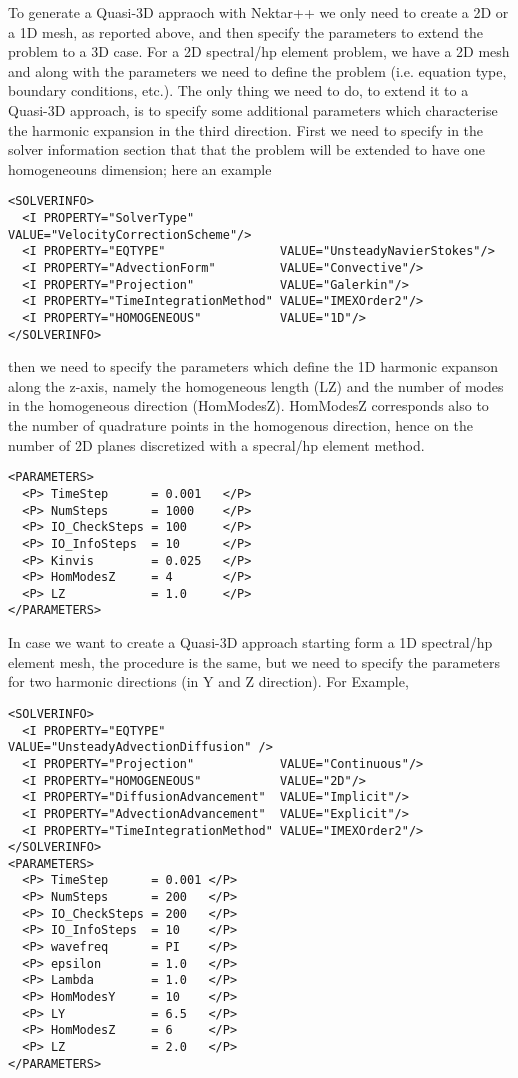 To generate a Quasi-3D appraoch with Nektar++ we only need to create a 2D or a
1D mesh, as reported above, and then specify the parameters to extend the
problem to a 3D case. For a 2D spectral/hp element problem, we have a 2D mesh
and along with the parameters we need to define the problem (i.e. equation type,
boundary conditions, etc.). The only thing we need to do, to extend it to a
Quasi-3D approach, is to specify some additional parameters which characterise
the harmonic expansion in the third direction. First we need to specify in the
solver information section that that the problem will be extended to have one
homogeneouns dimension; here an example

\begin{lstlisting}[style=XMLStyle]
<SOLVERINFO>
  <I PROPERTY="SolverType"            VALUE="VelocityCorrectionScheme"/>
  <I PROPERTY="EQTYPE"                VALUE="UnsteadyNavierStokes"/>
  <I PROPERTY="AdvectionForm"         VALUE="Convective"/>
  <I PROPERTY="Projection"            VALUE="Galerkin"/>
  <I PROPERTY="TimeIntegrationMethod" VALUE="IMEXOrder2"/>
  <I PROPERTY="HOMOGENEOUS"           VALUE="1D"/>
</SOLVERINFO>
\end{lstlisting}

then we need to specify the parameters which define the 1D harmonic expanson
along the z-axis, namely the homogeneous length (LZ) and the number of modes in
the homogeneous direction (HomModesZ). HomModesZ corresponds also to the number
of quadrature points in the homogenous direction, hence on the number of 2D
planes discretized with a specral/hp element method.

\begin{lstlisting}[style=XMLStyle]
<PARAMETERS>
  <P> TimeStep      = 0.001   </P>
  <P> NumSteps      = 1000    </P>
  <P> IO_CheckSteps = 100     </P>
  <P> IO_InfoSteps  = 10      </P>
  <P> Kinvis        = 0.025   </P>
  <P> HomModesZ     = 4       </P>
  <P> LZ            = 1.0     </P>
</PARAMETERS>
\end{lstlisting}

In case we want to create a Quasi-3D approach starting form a 1D spectral/hp
element mesh, the procedure is the same, but we need to specify the parameters
for two harmonic directions (in Y and Z direction). For Example,

\begin{lstlisting}[style=XMLStyle]
<SOLVERINFO>
  <I PROPERTY="EQTYPE"                VALUE="UnsteadyAdvectionDiffusion" />
  <I PROPERTY="Projection"            VALUE="Continuous"/>
  <I PROPERTY="HOMOGENEOUS"           VALUE="2D"/>
  <I PROPERTY="DiffusionAdvancement"  VALUE="Implicit"/>
  <I PROPERTY="AdvectionAdvancement"  VALUE="Explicit"/>
  <I PROPERTY="TimeIntegrationMethod" VALUE="IMEXOrder2"/>
</SOLVERINFO>
<PARAMETERS>
  <P> TimeStep      = 0.001 </P>
  <P> NumSteps      = 200   </P>
  <P> IO_CheckSteps = 200   </P>
  <P> IO_InfoSteps  = 10    </P>
  <P> wavefreq      = PI    </P>
  <P> epsilon       = 1.0   </P>
  <P> Lambda        = 1.0   </P>
  <P> HomModesY     = 10    </P>
  <P> LY            = 6.5   </P>
  <P> HomModesZ     = 6     </P>
  <P> LZ            = 2.0   </P>
</PARAMETERS>
\end{lstlisting}


